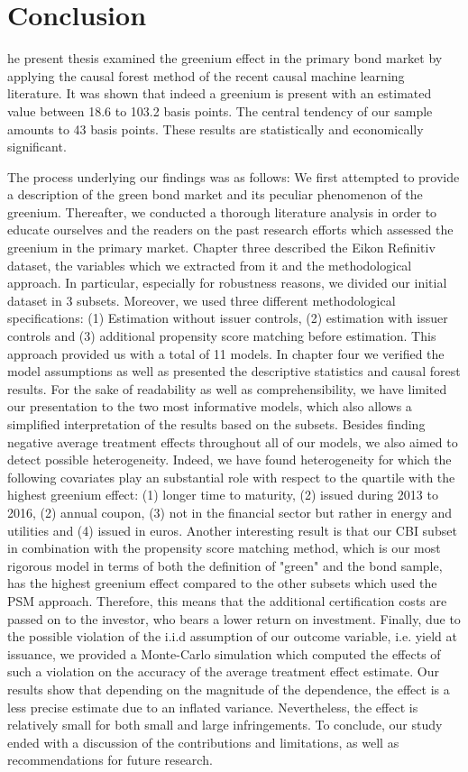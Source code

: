 %
%
\let\textcircled=\pgftextcircled
\chapter{Conclusion}
\label{chap:results}

he present thesis examined the greenium effect in the primary bond market by applying the causal forest method of the recent causal machine learning literature. It was shown that indeed a greenium is present with an estimated value between 18.6 to 103.2 basis points. The central tendency of our sample amounts to 43 basis points. These results are statistically and economically significant. 

The process underlying our findings was as follows: We first attempted to provide a description of the green bond market and its peculiar phenomenon of the greenium. Thereafter, we conducted a thorough literature analysis in order to educate ourselves and the readers on the past research efforts which assessed the greenium in the primary market. Chapter three described the Eikon Refinitiv dataset, the variables which we extracted from it and the methodological approach. In particular, especially for robustness reasons, we divided our initial dataset in 3 subsets. Moreover, we used three different methodological specifications: (1) Estimation without issuer controls, (2) estimation with issuer controls and (3) additional propensity score matching before estimation. This approach provided us with a total of 11 models. In chapter four we verified the model assumptions as well as presented the descriptive statistics and causal forest results. For the sake of readability as well as comprehensibility, we have limited our presentation to the two most informative models, which also allows a simplified interpretation of the results based on the subsets. Besides finding negative average treatment effects throughout all of our models, we also aimed to detect possible heterogeneity. Indeed, we have found heterogeneity for which the following covariates play an substantial role with respect to the quartile with the highest greenium effect: (1) longer time to maturity, (2) issued during 2013 to 2016, (2) annual coupon, (3) not in the financial sector but rather in energy and utilities and (4) issued in euros. Another interesting result is that our CBI subset in combination with the propensity score matching method, which is our most rigorous model in terms of both the definition of "green" and the bond sample, has the highest greenium effect compared to the other subsets which used the PSM approach. Therefore, this means that the additional certification costs are passed on to the investor, who bears a lower return on investment. Finally, due to the possible violation of the i.i.d assumption of our outcome variable, i.e. yield at issuance, we provided a Monte-Carlo simulation which computed the effects of such a violation on the accuracy of the average treatment effect estimate. Our results show that depending on the magnitude of the dependence, the effect is a less precise estimate due to an inflated variance. Nevertheless, the effect is relatively small for both small and large infringements. To conclude, our study ended with a discussion of the contributions and limitations, as well as recommendations for future research.

